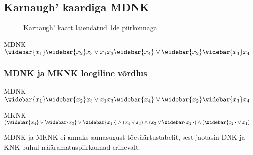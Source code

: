 \documentclass{article}
\newcommand{\wb}{\widebar}
\begin{document}
\subsection{Karnaugh' kaardiga MDNK}




\begin{figure}[H]
\centering
\begin{Karnaugh}
\end{Karnaugh}
\caption{Karnaugh' kaart laiendatud 1de piirkonnaga}
\label{fig:karnaugh-piirkond1}
\end{figure}
MDNK $\wb{x_1}\wb{x_2}x_3 \lor x_1x_3\wb{x_4} \lor \wb{x_2}\wb{x_3}x_4$


\subsubsection{MDNK ja MKNK loogiline võrdlus}
MDNK $\wb{x_1}\wb{x_2}x_3 \lor x_1x_3\wb{x_4} \lor \wb{x_2}\wb{x_3}x_4$

MKNK $(\wb{x_4} \lor \wb{x_3} \lor \wb{x_1}) \land (x_4 \lor x_3) \land (x_3 \lor \wb{x_2}) \land (\wb{x_2} \lor x_1)$

MDNK ja MKNK ei annaks samasugust tõeväärtustabelit, sest jaotasin DNK ja KNK puhul määramatuspiirkonnad erinevalt.
\end{document}
